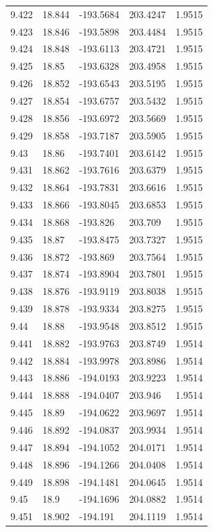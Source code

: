 \begin{tabular}{lllll}
9.422 & 18.844 & -193.5684 & 203.4247 & 1.9515 \\
9.423 & 18.846 & -193.5898 & 203.4484 & 1.9515 \\
9.424 & 18.848 & -193.6113 & 203.4721 & 1.9515 \\
9.425 & 18.85 & -193.6328 & 203.4958 & 1.9515 \\
9.426 & 18.852 & -193.6543 & 203.5195 & 1.9515 \\
9.427 & 18.854 & -193.6757 & 203.5432 & 1.9515 \\
9.428 & 18.856 & -193.6972 & 203.5669 & 1.9515 \\
9.429 & 18.858 & -193.7187 & 203.5905 & 1.9515 \\
9.43 & 18.86 & -193.7401 & 203.6142 & 1.9515 \\
9.431 & 18.862 & -193.7616 & 203.6379 & 1.9515 \\
9.432 & 18.864 & -193.7831 & 203.6616 & 1.9515 \\
9.433 & 18.866 & -193.8045 & 203.6853 & 1.9515 \\
9.434 & 18.868 & -193.826 & 203.709 & 1.9515 \\
9.435 & 18.87 & -193.8475 & 203.7327 & 1.9515 \\
9.436 & 18.872 & -193.869 & 203.7564 & 1.9515 \\
9.437 & 18.874 & -193.8904 & 203.7801 & 1.9515 \\
9.438 & 18.876 & -193.9119 & 203.8038 & 1.9515 \\
9.439 & 18.878 & -193.9334 & 203.8275 & 1.9515 \\
9.44 & 18.88 & -193.9548 & 203.8512 & 1.9515 \\
9.441 & 18.882 & -193.9763 & 203.8749 & 1.9514 \\
9.442 & 18.884 & -193.9978 & 203.8986 & 1.9514 \\
9.443 & 18.886 & -194.0193 & 203.9223 & 1.9514 \\
9.444 & 18.888 & -194.0407 & 203.946 & 1.9514 \\
9.445 & 18.89 & -194.0622 & 203.9697 & 1.9514 \\
9.446 & 18.892 & -194.0837 & 203.9934 & 1.9514 \\
9.447 & 18.894 & -194.1052 & 204.0171 & 1.9514 \\
9.448 & 18.896 & -194.1266 & 204.0408 & 1.9514 \\
9.449 & 18.898 & -194.1481 & 204.0645 & 1.9514 \\
9.45 & 18.9 & -194.1696 & 204.0882 & 1.9514 \\
9.451 & 18.902 & -194.191 & 204.1119 & 1.9514 \\

\end{tabular}
